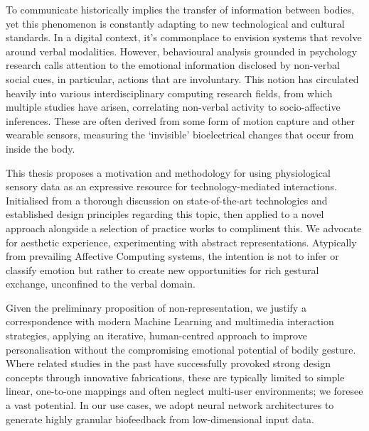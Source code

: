 

To communicate historically implies the transfer of information between bodies, yet this phenomenon is constantly adapting to new technological and cultural standards. In a digital context, it’s commonplace to envision systems that revolve around verbal modalities. However, behavioural analysis grounded in psychology research calls attention to the emotional information disclosed by non-verbal social cues, in particular, actions that are involuntary. This notion has circulated heavily into various interdisciplinary computing research fields, from which multiple studies have arisen, correlating non-verbal activity to socio-affective inferences. These are often derived from some form of motion capture and other wearable sensors, measuring the ‘invisible’ bioelectrical changes that occur from inside the body. 

This thesis proposes a motivation and methodology for using physiological sensory data as an expressive resource for technology-mediated interactions. Initialised from a thorough discussion on state-of-the-art technologies and established design principles regarding this topic, then applied to a novel approach alongside a selection of practice works to compliment this. We advocate for aesthetic experience, experimenting with abstract representations. Atypically from prevailing Affective Computing systems, the intention is not to infer or classify emotion but rather to create new opportunities for rich gestural exchange, unconfined to the verbal domain. 

Given the preliminary proposition of non-representation, we justify a correspondence with modern Machine Learning and multimedia interaction strategies, applying an iterative, human-centred approach to improve personalisation without the compromising emotional potential of bodily gesture. Where related studies in the past have successfully provoked strong design concepts through innovative fabrications, these are typically limited to simple linear, one-to-one mappings and often neglect multi-user environments; we foresee a vast potential. In our use cases, we adopt neural network architectures to generate highly granular biofeedback from low-dimensional input data.

